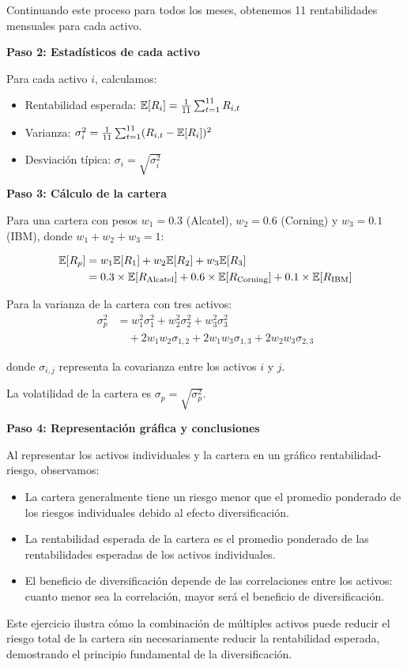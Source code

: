 \begin{ejemplo}
Continuando este proceso para todos los meses, obtenemos 11 rentabilidades mensuales para cada activo.

\textbf{Paso 2: Estadísticos de cada activo}

Para cada activo $i$, calculamos:
\begin{itemize}
\item Rentabilidad esperada: $\mathbb{E}[R_i] = \frac{1}{11}\sum_{t=1}^{11} R_{i,t}$
\item Varianza: $\sigma_i^2 = \frac{1}{11}\sum_{t=1}^{11} (R_{i,t} - \mathbb{E}[R_i])^2$
\item Desviación típica: $\sigma_i = \sqrt{\sigma_i^2}$
\end{itemize}

\textbf{Paso 3: Cálculo de la cartera}

Para una cartera con pesos $w_1 = 0.3$ (Alcatel), $w_2 = 0.6$ (Corning) y $w_3 = 0.1$ (IBM), donde $w_1 + w_2 + w_3 = 1$:

\begin{align*}
\mathbb{E}[R_p] &= w_1 \mathbb{E}[R_1] + w_2 \mathbb{E}[R_2] + w_3 \mathbb{E}[R_3]\\
&= 0.3 \times \mathbb{E}[R_{\text{Alcatel}}] + 0.6 \times \mathbb{E}[R_{\text{Corning}}] + 0.1 \times \mathbb{E}[R_{\text{IBM}}]
\end{align*}

Para la varianza de la cartera con tres activos:
\begin{align*}
\sigma_p^2 &= w_1^2 \sigma_1^2 + w_2^2 \sigma_2^2 + w_3^2 \sigma_3^2\\
&\quad + 2w_1 w_2 \sigma_{1,2} + 2w_1 w_3 \sigma_{1,3} + 2w_2 w_3 \sigma_{2,3}
\end{align*}

donde $\sigma_{i,j}$ representa la covarianza entre los activos $i$ y $j$.

La volatilidad de la cartera es $\sigma_p = \sqrt{\sigma_p^2}$.

\textbf{Paso 4: Representación gráfica y conclusiones}

Al representar los activos individuales y la cartera en un gráfico rentabilidad-riesgo, observamos:
\begin{itemize}
\item La cartera generalmente tiene un riesgo menor que el promedio ponderado de los riesgos individuales debido al efecto diversificación.
\item La rentabilidad esperada de la cartera es el promedio ponderado de las rentabilidades esperadas de los activos individuales.
\item El beneficio de diversificación depende de las correlaciones entre los activos: cuanto menor sea la correlación, mayor será el beneficio de diversificación.
\end{itemize}

Este ejercicio ilustra cómo la combinación de múltiples activos puede reducir el riesgo total de la cartera sin necesariamente reducir la rentabilidad esperada, demostrando el principio fundamental de la diversificación.
\end{ejemplo}

